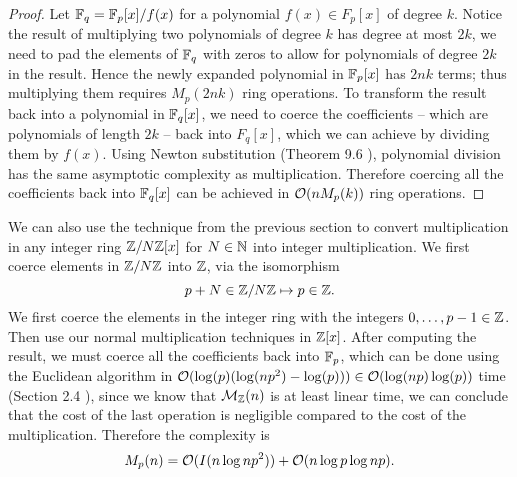 \begin{proof}
    Let ${\mathbb F}_q = {\mathbb F}_p[x] / f(x)$ for a polynomial $f(x) \in F_p[x]$ of degree $k$. Notice the result of multiplying two polynomials of degree $k$ has degree at most $2k$, we need to pad the elements of ${\mathbb F}_q$ with zeros to allow for polynomials of degree $2k$ in the result. Hence the newly expanded polynomial in ${\mathbb F}_p[x]$ has $2nk$ terms; thus multiplying them requires $M_p(2nk)$ ring operations. To transform the result back into a polynomial in ${\mathbb F}_q[x]$, we need to coerce the coefficients -- which are polynomials of length $2k$ -- back into $F_q[x]$, which we can achieve by dividing them by $f(x)$. Using Newton substitution (Theorem 9.6 \cite{modern-comp-alg}), polynomial division has the same asymptotic complexity as multiplication. Therefore coercing all the coefficients back into ${\mathbb F}_q[x]$ can be achieved in $\mathcal O(n M_p(k))$ ring operations.
\end{proof}

We can also use the technique from the previous section to convert multiplication in any integer ring ${\mathbb Z}/N{\mathbb Z}[x]$ for $N \in {\mathbb N}$ into integer multiplication. We first coerce elements in ${\mathbb Z}/N{\mathbb Z}$ into ${\mathbb Z}$, via the isomorphism
\[
    p + N \in {\mathbb Z}/N{\mathbb Z} \mapsto p \in {\mathbb Z}.
\]
We first coerce the elements in the integer ring with the integers $0,\ldots, p-1 \in {\mathbb Z}$. Then use our normal multiplication techniques in ${\mathbb Z}[x]$. After computing the result, we must coerce all the coefficients back into ${\mathbb F}_p$, which can be done using the Euclidean algorithm in $\mathcal O(\log(p)(\log(np^2) - \log (p))) \in \mathcal O(\log (np)\log (p))$ time (Section 2.4 \cite{modern-comp-alg}), since we know that $\mathcal M_{\mathbb Z}(n)$ is at least linear time, we can conclude that the cost of the last operation is negligible compared to the cost of the multiplication. Therefore the complexity is
\[
    M_p(n) = \mathcal O(I(n \log np^2)) + \mathcal O(n \log p \log np).
\]
